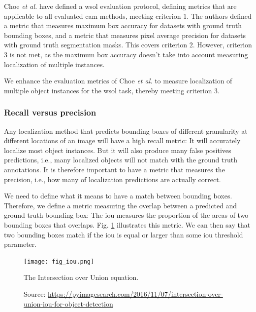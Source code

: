 Choe \textit{et al.} \cite{choe2020evaluating} have defined a \acrshort{wsol} evaluation protocol, defining metrics that are applicable to all evaluated \acrshort{cam} methods, meeting criterion 1. The authors defined a metric that measures maximum box accuracy for datasets with ground truth bounding boxes, and a metric that measures pixel average precision for datasets with ground truth segmentation masks. This covers criterion 2. However, criterion 3 is not met, as the maximum box accuracy doesn't take into account measuring localization of multiple instances.

We enhance the evaluation metrics of Choe \textit{et al.} to measure localization of multiple object instances for the \acrshort{wsol} task, thereby meeting criterion 3.

\subsubsection{Recall versus precision}
Any localization method that predicts bounding boxes of different granularity at different locations of an image will have a high recall metric: It will accurately localize most object instances. But it will also produce many false positives predictions, i.e., many localized objects will not match with the ground truth annotations. It is therefore important to have a metric that measures the precision, i.e., how many of localization predictions are actually correct.

We need to define what it means to have a match between bounding boxes. Therefore, we define a metric measuring the overlap between a predicted and ground truth bounding box: The \acrfull{iou} measures the proportion of the areas of two bounding boxes that overlaps. Fig. \ref{fig:iou} illustrates this metric.  We can then say that two bounding boxes match if the \acrshort{iou} is equal or larger than some \acrshort{iou} threshold parameter.

\begin{figure}[ht]
    \begin{center}       
    \texttt{[image: fig\_iou.png]}
    \caption[The IoU equation]{The Intersection over Union equation.}
    \caption*{Source: \href{https://pyimagesearch.com/2016/11/07/intersection-over-union-iou-for-object-detection}{https://pyimagesearch.com/2016/11/07/intersection-over-union-iou-for-object-detection}}
    \label{fig:iou}
    \end{center}
\end{figure}

